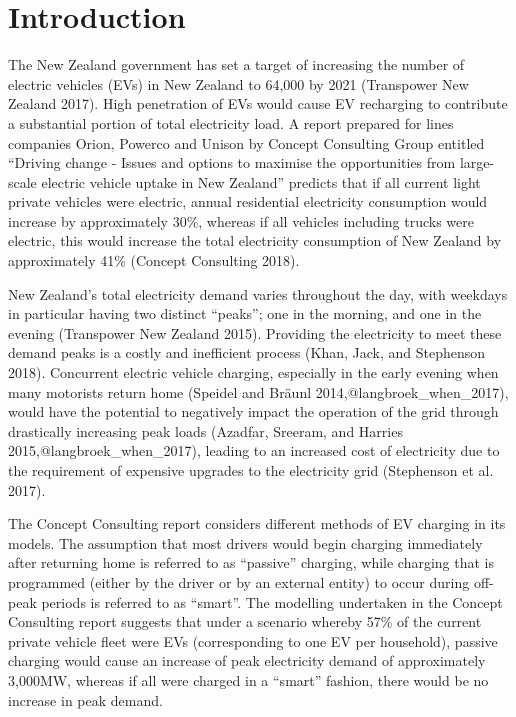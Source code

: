 \documentclass[]{article}
\title{}
\author{Rafferty Parker and Ben Anderson (\href{mailto:ben.anderson@otago.ac.nz}{\nolinkurl{ben.anderson@otago.ac.nz}}), \href{https://www.otago.ac.nz/centre-sustainability/}{Centre for Sustainability}, University of Otago; Daniel Myall (\href{mailto:daniel@zeno.nz}{\nolinkurl{daniel@zeno.nz}}, Flip The Fleet)}
\date{Last run at: 2019-08-02 14:54:24}
\begin{document}
{
\setcounter{tocdepth}{2}
\tableofcontents
}
\hypertarget{introduction}{%
\section{Introduction}\label{introduction}}

The New Zealand government has set a target of increasing the number of electric vehicles (EVs) in New Zealand to 64,000 by 2021 (Transpower New Zealand 2017). High penetration of EVs would cause EV recharging to contribute a substantial portion of total electricity load. A report prepared for lines companies Orion, Powerco and Unison by Concept Consulting Group entitled ``Driving change - Issues and options to maximise the opportunities from large-scale electric vehicle uptake in New Zealand'' predicts that if all current light private vehicles were electric, annual residential electricity consumption would increase by approximately 30\%, whereas if all vehicles including trucks were electric, this would increase the total electricity consumption of New Zealand by approximately 41\% (Concept Consulting 2018).

New Zealand's total electricity demand varies throughout the day, with weekdays in particular having two distinct ``peaks''; one in the morning, and one in the evening (Transpower New Zealand 2015). Providing the electricity to meet these demand peaks is a costly and inefficient process (Khan, Jack, and Stephenson 2018). Concurrent electric vehicle charging, especially in the early evening when many motorists return home (Speidel and Bräunl 2014,@langbroek\_when\_2017), would have the potential to negatively impact the operation of the grid through drastically increasing peak loads (Azadfar, Sreeram, and Harries 2015,@langbroek\_when\_2017), leading to an increased cost of electricity due to the requirement of expensive upgrades to the electricity grid (Stephenson et al. 2017).

The Concept Consulting report considers different methods of EV charging in its models. The assumption that most drivers would begin charging immediately after returning home is referred to as ``passive'' charging, while charging that is programmed (either by the driver or by an external entity) to occur during off-peak periods is referred to as ``smart''. The modelling undertaken in the Concept Consulting report suggests that under a scenario whereby 57\% of the current private vehicle fleet were EVs (corresponding to one EV per household), passive charging would cause an increase of peak electricity demand of approximately 3,000MW, whereas if all were charged in a ``smart'' fashion, there would be no increase in peak demand.
\end{document}
